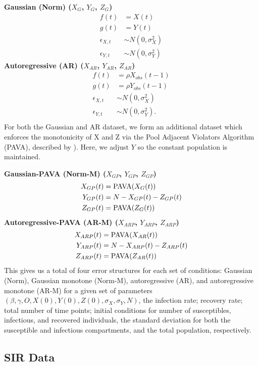 \documentclass[12pt]{article}
\begin{document}
\noindent \textbf{Gaussian (Norm) ($X_{G}$, $Y_{G}$, $Z_{G}$)}
\begin{align*}
  f(t) &= X(t) \\
  g(t) &= Y(t) \\
  \epsilon_{X,t} &\sim N(0, \sigma_X^2) \\
  \epsilon_{Y,t} &\sim N(0, \sigma_Y^2)
\end{align*}
\textbf{Autoregressive (AR) ($X_{AR}$, $Y_{AR}$, $Z_{AR}$)}
\begin{align*}
  f(t) &= \rho X_{obs}(t-1) \\
  g(t) &= \rho Y_{obs}(t-1) \\
  \epsilon_{X,t} &\sim N(0, \sigma_X^2) \\
  \epsilon_{Y,t} &\sim N(0, \sigma_Y^2).\\
\end{align*}
For both the Gaussian and AR dataset, we form an additional dataset which enforces the monotonicity of X and Z via the Pool Adjacent Violators Algorithm (PAVA), described by \cite{friedman1984}).  Here, we adjust $Y$ so the constant population is maintained.

\noindent \textbf{Gaussian-PAVA (Norm-M) ($X_{GP}$, $Y_{GP}$, $Z_{GP}$)}
\begin{align*}
 X_{GP}(t) &= \textnormal{PAVA}(X_G(t)) \\
  Y_{GP}(t) &= N - X_{GP}(t) - Z_{GP}(t) \\
  Z_{GP}(t) &= \textnormal{PAVA}(Z_G(t)) \\
\end{align*}
\textbf{Autoregressive-PAVA (AR-M) ($X_{ARP}$, $Y_{ARP}$, $Z_{ARP}$)}
\begin{align*}
  X_{ARP}(t) &= \textnormal{PAVA}(X_{AR}(t)) \\
  Y_{ARP}(t) &= N - X_{ARP}(t) - Z_{ARP}(t) \\
  Z_{ARP}(t) &= \textnormal{PAVA}(Z_{AR}(t)) 
\end{align*}
This gives us a total of four error structures for each set of conditions: Gaussian (Norm), Gaussian monotone (Norm-M), autoregressive (AR), and autoregressive monotone (AR-M) for a given set of parameters $(\beta, \gamma, O, X(0), Y(0), Z(0), \sigma_X, \sigma_Y, N)$, the infection rate; recovery rate; total number of time points; initial conditions for number of susceptibles, infectious, and recovered individuals, the standard deviation for both the susceptible and infectious compartments, and the total population, respectively.


\subsection{SIR Data}
\end{document}
